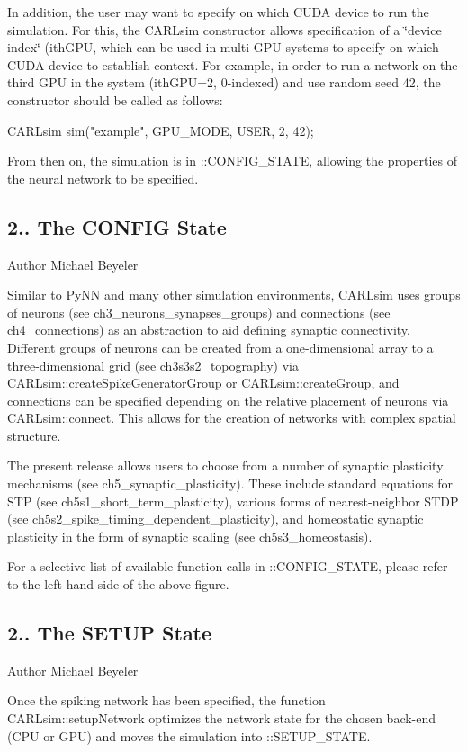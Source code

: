 In addition, the user may want to specify on which C\+U\+DA device to run the simulation. For this, the C\+A\+R\+Lsim constructor allows specification of a \char`\"{}device index\char`\"{} ({\ttfamily ith\+G\+PU}, which can be used in multi-\/\+G\+PU systems to specify on which C\+U\+DA device to establish context. For example, in order to run a network on the third G\+PU in the system ({\ttfamily ith\+G\+PU=2}, 0-\/indexed) and use random seed 42, the constructor should be called as follows\+: 
\begin{DoxyCode}
CARLsim sim(\textcolor{stringliteral}{"example"}, GPU\_MODE, USER, 2, 42);
\end{DoxyCode}


From then on, the simulation is in \+::\+C\+O\+N\+F\+I\+G\+\_\+\+S\+T\+A\+TE, allowing the properties of the neural network to be specified.\hypertarget{ch2_basic_concepts_ch2s1s1_config}{}\subsection{2.. The C\+O\+N\+F\+I\+G State}\label{ch2_basic_concepts_ch2s1s1_config}
\begin{DoxyAuthor}{Author}
Michael Beyeler
\end{DoxyAuthor}
Similar to Py\+NN and many other simulation environments, C\+A\+R\+Lsim uses groups of neurons (see ch3\+\_\+neurons\+\_\+synapses\+\_\+groups) and connections (see ch4\+\_\+connections) as an abstraction to aid defining synaptic connectivity. Different groups of neurons can be created from a one-\/dimensional array to a three-\/dimensional grid (see ch3s3s2\+\_\+topography) via C\+A\+R\+Lsim\+::create\+Spike\+Generator\+Group or C\+A\+R\+Lsim\+::create\+Group, and connections can be specified depending on the relative placement of neurons via C\+A\+R\+Lsim\+::connect. This allows for the creation of networks with complex spatial structure.

The present release allows users to choose from a number of synaptic plasticity mechanisms (see ch5\+\_\+synaptic\+\_\+plasticity). These include standard equations for S\+TP (see ch5s1\+\_\+short\+\_\+term\+\_\+plasticity), various forms of nearest-\/neighbor S\+T\+DP (see ch5s2\+\_\+spike\+\_\+timing\+\_\+dependent\+\_\+plasticity), and homeostatic synaptic plasticity in the form of synaptic scaling (see ch5s3\+\_\+homeostasis).

For a selective list of available function calls in \+::\+C\+O\+N\+F\+I\+G\+\_\+\+S\+T\+A\+TE, please refer to the left-\/hand side of the above figure.\hypertarget{ch2_basic_concepts_ch2s1s2_setup}{}\subsection{2.. The S\+E\+T\+U\+P State}\label{ch2_basic_concepts_ch2s1s2_setup}
\begin{DoxyAuthor}{Author}
Michael Beyeler
\end{DoxyAuthor}
Once the spiking network has been specified, the function C\+A\+R\+Lsim\+::setup\+Network optimizes the network state for the chosen back-\/end (C\+PU or G\+PU) and moves the simulation into \+::\+S\+E\+T\+U\+P\+\_\+\+S\+T\+A\+TE.

